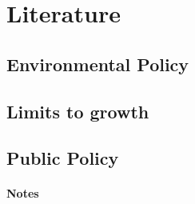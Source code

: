 \section{Literature}
\subsection{Environmental Policy}
\subsection{Limits to growth}
\subsection{Public Policy}

\paragraph{Notes \cite{Consoli2016DoCapital}}
